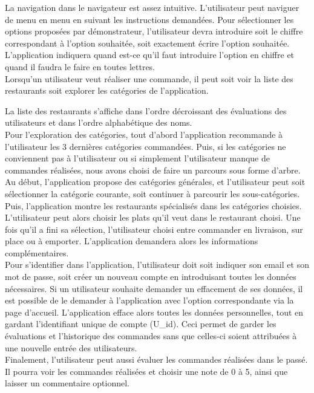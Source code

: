 \documentclass[10pt, a4paper]{article}
\begin{document}
La navigation dans le navigateur est assez intuitive. L'utilisateur peut naviguer de menu en menu en suivant 
les instructions demandées. Pour sélectionner les options proposées par  démonstrateur, l'utilisateur devra 
introduire soit le chiffre correspondant à l'option souhaitée, soit exactement écrire l'option souhaitée.
L'application indiquera quand est-ce qu'il faut introduire l'option en chiffre et quand il faudra le faire en toutes lettres. \\

Lorsqu'un utilisateur veut réaliser une commande, il peut soit voir la liste des restaurants soit explorer les catégories de l'application.

La liste des restaurants s'affiche dans l'ordre décroissant des évaluations des utilisateurs et dans l'ordre alphabétique des noms. \\

Pour l'exploration des catégories, tout d'abord l'application recommande à l'utilisateur les 3 dernières catégories
commandées. Puis, si les catégories ne conviennent pas à l'utilisateur ou si simplement l'utilisateur manque de commandes 
réalisées, nous avons choisi de faire un parcours sous forme d'arbre. Au début, l'application propose des catégories générales, et 
l'utilisateur peut soit sélectionner la catégorie courante, soit continuer à parcourir les sous-catégories. Puis, l'application montre 
les restaurants spécialisés dans les catégories choisies. \\

L'utilisateur peut alors choisir les plats qu'il veut dans le restaurant choisi. Une fois qu'il a fini sa sélection, l'utilisateur 
choisi entre commander en livraison, sur place ou à emporter. L'application demandera alors les informations complémentaires. \\

Pour s'identifier dans l'application, l'utilisateur doit soit indiquer son email et son mot de passe, soit créer un nouveau 
compte en introduisant toutes les données nécessaires. Si un utilisateur souhaite demander un effacement de ses données,
il est possible de le demander à l'application avec l'option correspondante via la page d'accueil. L'application efface 
alors toutes les données personnelles, tout en gardant l'identifiant unique de compte (U\_id). Ceci permet de garder les évaluations 
et l'historique des commandes sans que celles-ci soient attribuées à une nouvelle entrée des utilisateurs. \\

Finalement, l'utilisateur peut aussi évaluer les commandes réalisées dans le passé. Il pourra voir les commandes réalisées 
et choisir une note de 0 à 5, ainsi que laisser un commentaire optionnel.
\end{document}
